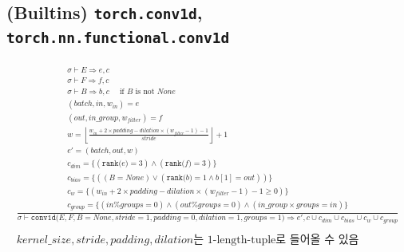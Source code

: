 \documentclass{article}
\newcommand{\x}{\times}
\newcommand{\rem}{\mtt{\%}}
\newcommand{\Rar}{\Rightarrow}
\newcommand{\ttt}[1]{\texttt{#1}}
\newcommand{\mtt}[1]{\mathtt{#1}}
\newcommand{\bigspace}{\,\,\,\,\,\,\,\,}
\newcommand{\op}[2]{\mtt{#1(}#2\mtt{)}}
\begin{document}
\subsection*{(Builtins) \ttt{torch.conv1d}, \ttt{torch.nn.functional.conv1d}}
\begin{align*}
  \frac
  {
    \begin{array}{l}
      \sigma \vdash E \Rar e, c \\
      \sigma \vdash F \Rar f, c \\
      \sigma \vdash B \Rar b, c \bigspace \text{if $B$ is not $None$} \\
      (batch, in, w_{in}) = e \\
      (out, in\_group, w_{filter}) = f \\
      w = \left\lfloor \frac{w_{in} + 2 \x padding - dilation
        \x (w_{filter} - 1) - 1}{stride} \right\rfloor + 1 \\
      e' = (batch, out, w) \\
      c_{dim} = \{ (\op{rank}{e} = 3) \land (\op{rank}{f} = 3) \} \\
      c_{bias} = \{ ((B = None) \lor (\op{rank}{b} = 1 \land b[1] = out)) \} \\
      c_w = \{ (w_{in} + 2 \x padding - dilation \x (w_{filter} - 1) - 1 \geq 0) \} \\
      c_{group} = \{ (in \rem groups = 0) \land (out \rem groups = 0)
        \land (in\_group \x groups = in)\}
    \end{array}
  }
  {
    \sigma \vdash \op{conv1d}{E, F, B=None, stride=1, padding=0,
      dilation=1, groups=1} \Rar e', c \cup c_{dim} \cup c_{bias} \cup 
      c_w \cup c_{group}
  } \\
  \\
  \text{$kernel\_size, stride, padding, dilation$는 1-length-tuple로 들어올
  수 있음}
\end{align*}%
\end{document}
